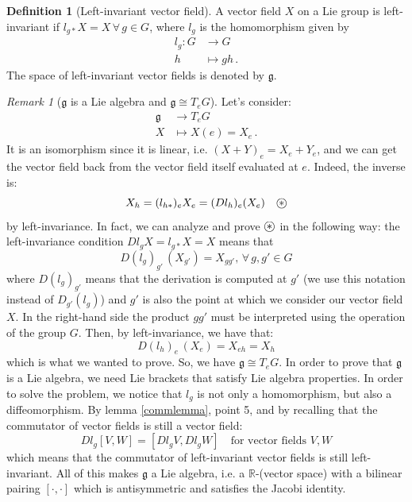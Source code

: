 \documentclass[a4paper,11pt,titlepage, article, oneside]{memoir}
\numberwithin{equation}{section}
\theoremstyle{definition}
\newtheorem{definition}[theorem]{Definition}
\theoremstyle{remark}
\newtheorem{remark}[theorem]{Remark}
\newcommand{\rfield}{\mathbb{R}}
\newcommand{\lie}[1]{\mathfrak{#1}}
\newcommand\oast{\stackMath\mathbin{\stackinset{c}{0ex}{c}{0ex}{\ast}{\bigcirc}}}
\begin{document}
\begin{definition}[Left-invariant vector field]
A vector field $X$ on a Lie group is left-invariant if $l_{g*}X = X\, \forall \, g \in G$, where $l_g$ is the homomorphism given by
\begin{align}
l_g \colon G &\rightarrow G \\
h &\mapsto gh \, . \nonumber
\end{align}
The space of left-invariant vector fields is denoted by $\lie{g}$.
\end{definition}

\begin{remarkbox} \begin{remark}[$\lie{g}$ is a Lie algebra and $\lie{g} \cong T_eG$]
Let's consider:
\begin{align}
\lie{g} &\rightarrow T_e G \\
X &\mapsto X(e) = X_e \, . \nonumber
\end{align}
It is an isomorphism since it is linear, i.e. $(X + Y)_e = X_e + Y_e$, and we can get the vector field back from the vector field itself evaluated at $e$. Indeed, the inverse is:
$$X_h = (l_{h*})_e X_e= (Dl_h)_e(X_e) \quad \oast$$
by left-invariance. In fact, we can analyze and prove $\oast$ in the following way: the left-invariance condition $D l_g X = l_{g*}X = X$ means that
$$D(l_g)_{g'}\, (X_{g'}) = X_{g g'}, \, \forall\, g, g' \in G$$
where $D(l_g)_{g'}$ means that the derivation is computed at $g'$ (we use this notation instead of $D_{g'}(l_g)$) and $g'$ is also the point at which we consider our vector field $X$. In the right-hand side the product $gg'$ must be interpreted using the operation of the group $G$. Then, by left-invariance, we have that:
$$D(l_h)_e\, (X_e) = X_{e h} = X_h$$
which is what we wanted to prove.
So, we have $\lie{g} \cong T_e G$. In order to prove that $\lie{g}$ is a Lie algebra, we need Lie brackets that satisfy Lie algebra properties. In order to solve the problem, we notice that $l_g$ is not only a homomorphism, but also a diffeomorphism. By lemma \ref{commlemma}, point 5, and by recalling that the commutator of vector fields is still a vector field:
$$Dl_g [V, W] = [Dl_g V, Dl_g W] \quad \text{for vector fields } V, W$$
which means that the commutator of left-invariant vector fields is still left-invariant.
All of this makes $\lie{g}$ a Lie algebra, i.e. a $\rfield$-(vector space) with a bilinear pairing $[\cdot, \cdot]$ which is antisymmetric and satisfies the Jacobi identity.
\end{remark} \end{remarkbox}
\end{document}
